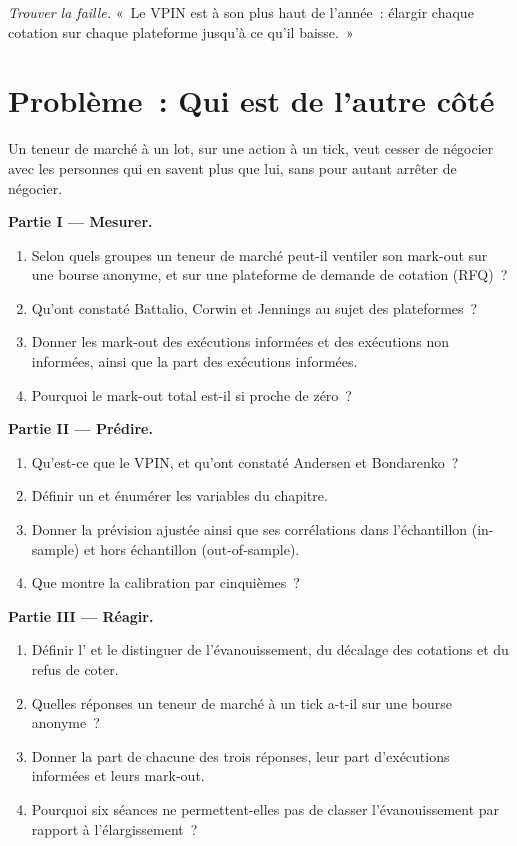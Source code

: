 \begin{exercise}[$\star\star\star$]\label{exo:hf:adverse-selection-and-toxicity:8}
\emph{Trouver la faille.} «~Le VPIN est à son plus haut de l'année~: élargir chaque cotation sur chaque plateforme jusqu'à ce qu'il baisse.~»
\end{exercise}

\section{Problème~: Qui est de l'autre côté}

\begin{problem}\label{pb:hf:adverse-selection-and-toxicity:1}
Un teneur de marché à un lot, sur une action à un tick, veut cesser de négocier avec les personnes qui en savent plus que lui, sans pour autant arrêter de négocier.

\medskip\noindent\textbf{Partie I --- Mesurer.}
\begin{enumerate}
\item Selon quels groupes un teneur de marché peut-il ventiler son mark-out sur une bourse anonyme, et sur une plateforme de demande de cotation (RFQ)~?
\item Qu'ont constaté Battalio, Corwin et Jennings au sujet des plateformes~?
\item Donner les mark-out des exécutions informées et des exécutions non informées, ainsi que la part des exécutions informées.
\item Pourquoi le mark-out total est-il si proche de zéro~?
\end{enumerate}

\medskip\noindent\textbf{Partie II --- Prédire.}
\begin{enumerate}[resume]
\item Qu'est-ce que le VPIN, et qu'ont constaté Andersen et Bondarenko~?
\item Définir un  et énumérer les variables du chapitre.
\item Donner la prévision ajustée ainsi que ses corrélations dans l'échantillon (in-sample) et hors échantillon (out-of-sample).
\item Que montre la calibration par cinquièmes~?
\end{enumerate}

\medskip\noindent\textbf{Partie III --- Réagir.}
\begin{enumerate}[resume]
\item Définir l' et le distinguer de l'évanouissement, du décalage des cotations et du refus de coter.
\item Quelles réponses un teneur de marché à un tick a-t-il sur une bourse anonyme~?
\item Donner la part de chacune des trois réponses, leur part d'exécutions informées et leurs mark-out.
\item Pourquoi six séances ne permettent-elles pas de classer l'évanouissement par rapport à l'élargissement~?
\end{enumerate}


\end{problem}
